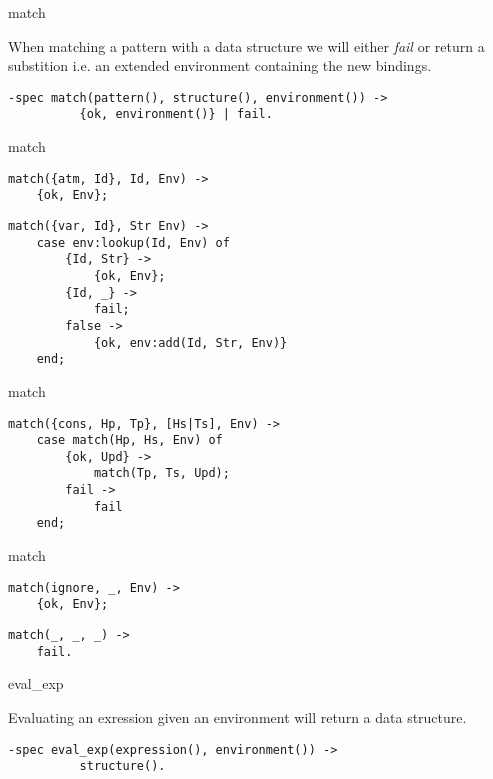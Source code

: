 \begin{frame}[fragile]{match}

When matching a pattern with a data structure we will either {\em
fail} or return a substition i.e. an extended environment containing the new
bindings.

\begin{verbatim}
-spec match(pattern(), structure(), environment()) -> 
          {ok, environment()} | fail.
\end{verbatim}

\end{frame}


\begin{frame}[fragile]{match}

\begin{verbatim}
match({atm, Id}, Id, Env) ->    
    {ok, Env};
\end{verbatim}
\pause
\begin{verbatim}
match({var, Id}, Str Env) -> 
    case env:lookup(Id, Env) of
        {Id, Str} ->
            {ok, Env};
        {Id, _} ->
            fail;
        false ->
            {ok, env:add(Id, Str, Env)}
    end;
\end{verbatim}
\end{frame}

\begin{frame}[fragile]{match}

\begin{verbatim}
match({cons, Hp, Tp}, [Hs|Ts], Env) -> 
    case match(Hp, Hs, Env) of
        {ok, Upd} ->
            match(Tp, Ts, Upd);
        fail ->
            fail
    end;
\end{verbatim}

\end{frame}

\begin{frame}[fragile]{match}
\begin{verbatim}
match(ignore, _, Env) ->
    {ok, Env};
\end{verbatim}
\pause
\begin{verbatim}
match(_, _, _) -> 
    fail.
\end{verbatim}

\end{frame}


\begin{frame}[fragile]{eval\_exp}

Evaluating an exression given an environment will return a data structure.

\pause\vspace{20pt}

\begin{verbatim}
-spec eval_exp(expression(), environment()) -> 
          structure().
\end{verbatim}

\end{frame}


